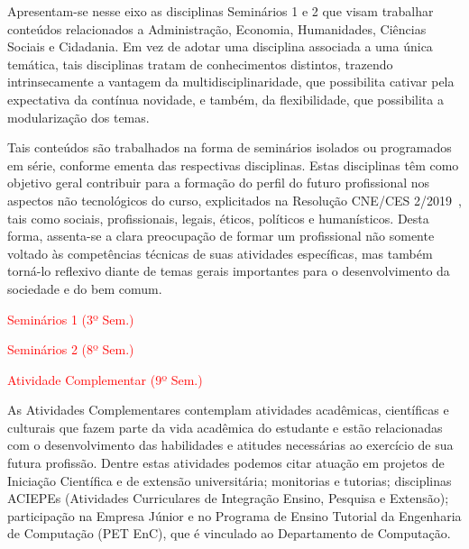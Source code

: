Apresentam-se nesse eixo as disciplinas Seminários 1 e 2 que visam trabalhar conteúdos relacionados a Administração, Economia, Humanidades, Ciências Sociais e Cidadania. Em vez de adotar uma disciplina associada a uma única temática, tais disciplinas tratam de conhecimentos distintos, trazendo intrinsecamente a vantagem da multidisciplinaridade, que possibilita cativar pela expectativa da contínua novidade, e também, da flexibilidade, que possibilita a modularização dos temas.

Tais conteúdos são trabalhados na forma de seminários isolados ou programados em série, conforme ementa das respectivas disciplinas. Estas disciplinas têm como objetivo geral contribuir para a formação do perfil do futuro profissional nos aspectos não tecnológicos do curso, explicitados na Resolução CNE/CES 2/2019~\cite{CNE2019}, tais como sociais, profissionais, legais, éticos, políticos e humanísticos. Desta forma, assenta-se a clara preocupação de formar um profissional não somente voltado às competências técnicas de suas atividades específicas, mas também torná-lo reflexivo diante de temas gerais importantes para o desenvolvimento da sociedade e do bem comum.

\textcolor{red}{\begin{compenum}
    \item Seminários 1 (3º Sem.)
    \item Seminários 2 (8º Sem.)
    \item Atividade Complementar (9º Sem.)
\end{compenum}}

As Atividades Complementares contemplam atividades acadêmicas, científicas e culturais que fazem parte da vida acadêmica do estudante e estão relacionadas com o desenvolvimento das habilidades e atitudes necessárias ao exercício de sua futura profissão. Dentre estas atividades podemos citar atuação em projetos de Iniciação Científica e de extensão universitária; monitorias e tutorias; disciplinas ACIEPEs (Atividades Curriculares de Integração Ensino, Pesquisa e Extensão); participação na Empresa Júnior e no Programa de Ensino Tutorial da Engenharia de Computação (PET EnC), que é vinculado ao Departamento de Computação. %

